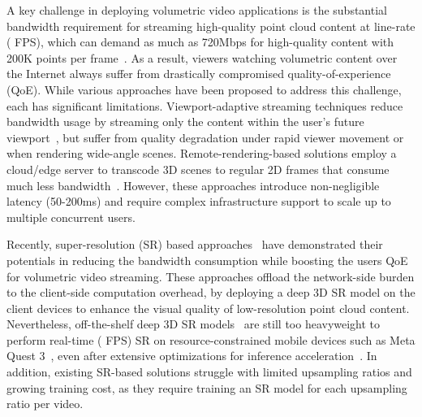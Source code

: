 A key challenge in deploying volumetric video applications is the substantial bandwidth requirement for streaming high-quality point cloud content at line-rate ( FPS), which can demand as much as 720Mbps for high-quality content with 200K points per frame~\cite{zhang_yuzu_nodate}. As a result, viewers watching volumetric content over the Internet always suffer from drastically compromised quality-of-experience (QoE).
%
While various approaches have been proposed to address this challenge, each has significant limitations. Viewport-adaptive streaming techniques reduce bandwidth usage by streaming only the content within the user's future viewport~\cite{han_vivo_2020, lee_groot_2020, liuMuV2ScalingMultiuser2024}, but suffer from quality degradation under rapid viewer movement or when rendering wide-angle scenes. 
%
Remote-rendering-based solutions employ a cloud/edge server to transcode 3D scenes to regular 2D frames that consume much less bandwidth~\cite{gul2020cloud, liu_vues_2022}. However, these approaches introduce non-negligible latency (50-200ms) and require complex infrastructure support to scale up to multiple concurrent users.

Recently, super-resolution (SR) based approaches~\cite{zhang_yuzu_nodate} have demonstrated their potentials in reducing the bandwidth consumption while boosting the users QoE for volumetric video streaming. These approaches offload the network-side burden to the client-side computation overhead, by deploying a deep 3D SR model on the client devices to enhance the visual quality of low-resolution point cloud content. Nevertheless, off-the-shelf deep 3D SR models~\cite{li_pu-gan_2019, qianPUGCNPointCloud2021, yuPUNetPointCloud2018, wang_two-stage_2021, long_pc2-pu_2022} are still too heavyweight to perform real-time ( FPS) SR on resource-constrained mobile devices such as Meta Quest 3~\cite{meta_quest_compare}, even after extensive optimizations for inference acceleration~\cite{zhang_yuzu_nodate}. In addition, existing SR-based solutions struggle with limited upsampling ratios and growing training cost, as they require training an SR model for each upsampling ratio per video.

